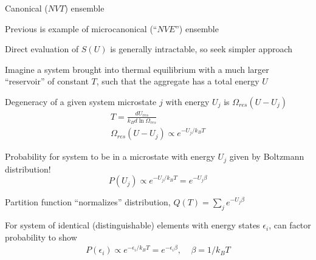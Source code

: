 \message{ !name(Outline.tex)}\documentclass[11pt]{article}
\begin{document}
\begin{outline}
\begin{outline}
    \item Canonical ($NVT$) ensemble
      \begin{outline}
      \item Previous is example of microcanonical (``$NVE$'') ensemble
      \item Direct evaluation of $S(U)$ is generally intractable, so seek simpler approach
      \item Imagine a system brought into thermal equilibrium with a much
        larger ``reservoir'' of constant $T$, such that the aggregate has a
        total energy $U$
      \item Degeneracy of a given system microstate $j$ with energy $U_j$
        is $\Omega_{res}(U-U_j)$
        \begin{eqnarray*}
          T = \frac{dU_{res}}{k_Bd\ln\Omega_{res}} \\
          \Omega_{res}(U-U_j) \propto e^{-U_j/k_B T}
        \end{eqnarray*}
      \item Probability for system to be in a microstate with energy $U_j$ given by Boltzmann
        distribution!
        \begin{displaymath}
          P(U_j) \propto e^{-U_j/k_B T} = e^{-U_j \beta}
        \end{displaymath}
      \item Partition function ``normalizes'' distribution, $Q(T) = \sum_j
        e^{-U_j \beta}$
      \item For system of identical (distinguishable) elements with energy states $\epsilon_i$,
        can factor probability to show
        \begin{eqnarray*}
          P(\epsilon_i) \propto e^{-\epsilon_i/k_B T} = e^{-\epsilon_i \beta},\
          \ \ \ \ \beta=1/k_BT
        \end{eqnarray*}
      \end{outline}



\end{outline}
\end{outline}
\end{document}
